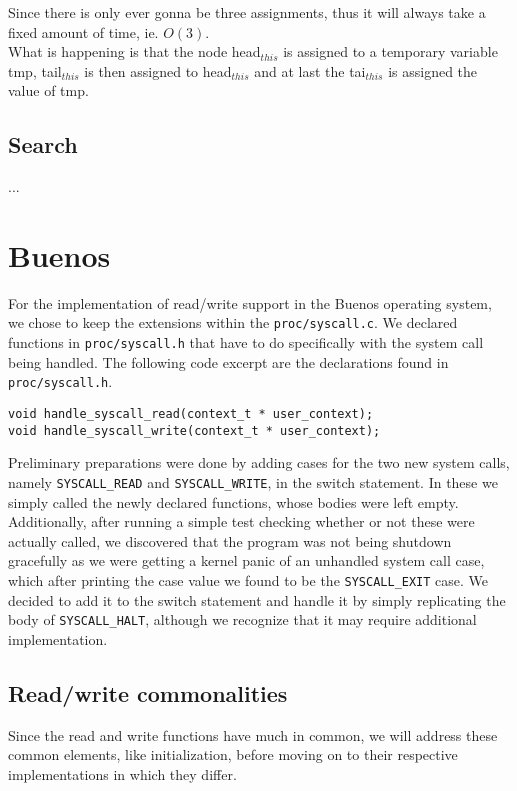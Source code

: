 \documentclass[11pt]{article}
\newcommand{\code}[1]{{\tt #1}}
\newcommand{\file}[1]{{\tt #1}}
\begin{document}
Since there is only ever gonna be three assignments, thus it will always take a
fixed amount of time, ie. $O(3)$.\\
What is happening is that the node head$_{this}$ is assigned to a temporary
variable tmp, tail$_{this}$ is then assigned to head$_{this}$ and at last the
tai$_{this}$ is assigned the value of tmp.

\subsection{Search}
...

\newpage
\section{Buenos}
For the implementation of read/write support in the Buenos operating system,
we chose to keep the extensions within the \file{proc/syscall.c}. We declared
functions in \file{proc/syscall.h} that have to do specifically with the
system call being handled. The following code excerpt are the declarations
found in \file{proc/syscall.h}.

\begin{lstlisting}
void handle_syscall_read(context_t * user_context);
void handle_syscall_write(context_t * user_context);
\end{lstlisting}

Preliminary preparations were done by adding cases for the two new system
calls, namely \code{SYSCALL\_READ} and \code{SYSCALL\_WRITE}, in the switch
statement. In these we simply called the newly declared functions, whose
bodies were left empty. Additionally, after running a simple test checking
whether or not these were actually called, we discovered that the program was
not being shutdown gracefully as we were getting a kernel panic of an
unhandled system call case, which after printing the case value we found to be
the \code{SYSCALL\_EXIT} case. We decided to add it to the switch statement
and handle it by simply replicating the body of \code{SYSCALL\_HALT}, although
we recognize that it may require additional implementation.

\subsection{Read/write commonalities}
Since the read and write functions have much in common, we will address these
common elements, like initialization, before moving on to their respective
implementations in which they differ.
\end{document}
